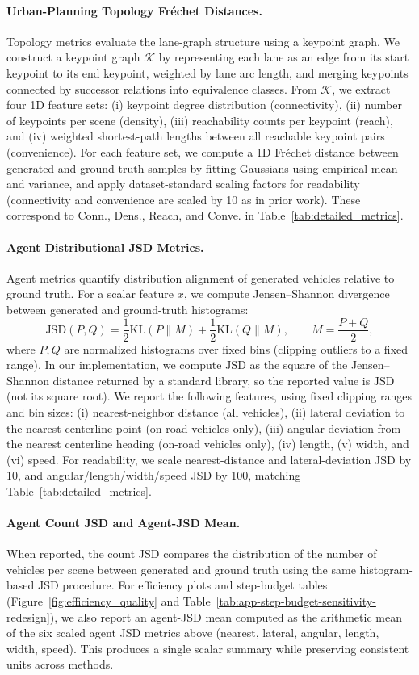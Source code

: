 \documentclass{article}
\theoremstyle{plain}
\theoremstyle{definition}
\theoremstyle{remark}
\begin{document}
\paragraph{Urban-Planning Topology Fr\'echet Distances.}
Topology metrics evaluate the lane-graph structure using a keypoint graph.
We construct a keypoint graph \(\mathcal{K}\) by representing each lane as an edge from its start keypoint to its end keypoint,
weighted by lane arc length, and merging keypoints connected by successor relations into equivalence classes.
From \(\mathcal{K}\), we extract four 1D feature sets:
(i) keypoint degree distribution (connectivity),
(ii) number of keypoints per scene (density),
(iii) reachability counts per keypoint (reach), and
(iv) weighted shortest-path lengths between all reachable keypoint pairs (convenience).
For each feature set, we compute a 1D Fr\'echet distance between generated and ground-truth samples by fitting Gaussians
using empirical mean and variance, and apply dataset-standard scaling factors for readability
(connectivity and convenience are scaled by 10 as in prior work).
These correspond to Conn., Dens., Reach, and Conve. in Table~\ref{tab:detailed_metrics}.

\paragraph{Agent Distributional JSD Metrics.}
Agent metrics quantify distribution alignment of generated vehicles relative to ground truth.
For a scalar feature \(x\), we compute Jensen--Shannon divergence between generated and ground-truth histograms:
\[
\mathrm{JSD}(P,Q)=\frac{1}{2}\mathrm{KL}(P\|M)+\frac{1}{2}\mathrm{KL}(Q\|M),
\qquad
M=\frac{P+Q}{2},
\]
where \(P,Q\) are normalized histograms over fixed bins (clipping outliers to a fixed range).
In our implementation, we compute \(\mathrm{JSD}\) as the square of the Jensen--Shannon distance returned by a standard library,
so the reported value is \(\mathrm{JSD}\) (not its square root).
We report the following features, using fixed clipping ranges and bin sizes:
(i) nearest-neighbor distance (all vehicles),
(ii) lateral deviation to the nearest centerline point (on-road vehicles only),
(iii) angular deviation from the nearest centerline heading (on-road vehicles only),
(iv) length, (v) width, and (vi) speed.
For readability, we scale nearest-distance and lateral-deviation JSD by 10, and angular/length/width/speed JSD by 100, matching
Table~\ref{tab:detailed_metrics}.

\paragraph{Agent Count JSD and Agent-JSD Mean.}
When reported, the count JSD compares the distribution of the number of vehicles per scene between generated and ground truth
using the same histogram-based JSD procedure.
For efficiency plots and step-budget tables (Figure~\ref{fig:efficiency_quality} and Table~\ref{tab:app-step-budget-sensitivity-redesign}),
we also report an agent-JSD mean computed as the arithmetic mean of the six scaled agent JSD metrics above
(nearest, lateral, angular, length, width, speed). This produces a single scalar summary while preserving consistent units across methods.
\end{document}
